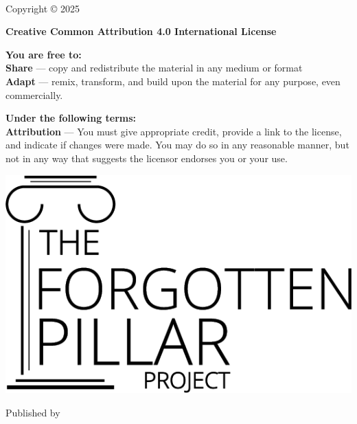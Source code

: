 
{\small
\setlength{\parindent}{0em}\setlength{\parskip}{1em}
~
\vfill

Copyright \copyright{} 2025 \website

\textbf{Creative Common Attribution 4.0 International License}

\textbf{You are free to:} \\
\textbf{Share} — copy and redistribute the material in any medium or format \\
\textbf{Adapt} — remix, transform, and build upon the material for any purpose, even commercially.

\textbf{Under the following terms:} \\
\textbf{Attribution} — You must give appropriate credit, provide a link to the license, and indicate if changes were made. You may do so in any reasonable manner, but not in any way that suggests the licensor endorses you or your use.


\ifx\isbn\undefined\else\if\relax\detokenize\expandafter{\isbn}\relax{}\fi\fi

\includegraphics[width=0.21\linewidth]{images/logo-black.png}

Published by \publisher{}
}
